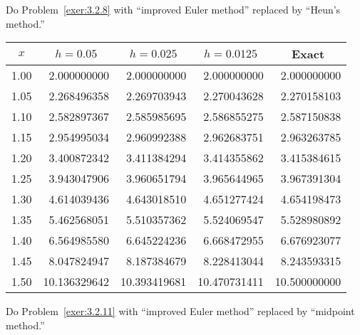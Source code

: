 \documentclass{ximera}
\begin{document}
\begin{problem}\label{exer:3.2.26}
Do Problem~\ref{exer:3.2.8} with ``improved Euler method''
replaced by ``Heun's method.''

\begin{solution}
    {\small
\begin{tabular}{|c|r|r|r|r|}\hline
\multicolumn{1}{|c|}{$x$}&
\multicolumn{1}{|c|}{$h=0.05$}&
\multicolumn{1}{|c|}{$h=0.025$}&
\multicolumn{1}{|c|}{$h=0.0125$}&
\multicolumn{1}{|c|}{Exact}\\ \hline
1.00 &  2.000000000 &  2.000000000 &  2.000000000 &  2.000000000 \\
1.05 &  2.268496358 &  2.269703943 &  2.270043628 &  2.270158103 \\
1.10 &  2.582897367 &  2.585985695 &  2.586855275 &  2.587150838 \\
1.15 &  2.954995034 &  2.960992388 &  2.962683751 &  2.963263785 \\
1.20 &  3.400872342 &  3.411384294 &  3.414355862 &  3.415384615 \\
1.25 &  3.943047906 &  3.960651794 &  3.965644965 &  3.967391304 \\
1.30 &  4.614039436 &  4.643018510 &  4.651277424 &  4.654198473 \\
1.35 &  5.462568051 &  5.510357362 &  5.524069547 &  5.528980892 \\
1.40 &  6.564985580 &  6.645224236 &  6.668472955 &  6.676923077 \\
1.45 &  8.047824947 &  8.187384679 &  8.228413044 &  8.243593315 \\
1.50 & 10.136329642 & 10.393419681 & 10.470731411 & 10.500000000 \\
\hline
\end{tabular}}
\end{solution}
\end{problem}

\begin{problem}\label{exer:3.2.27} 
Do Problem~\ref{exer:3.2.11} with ``improved Euler method''
replaced by ``midpoint method.''
\end{problem}
\end{document}
